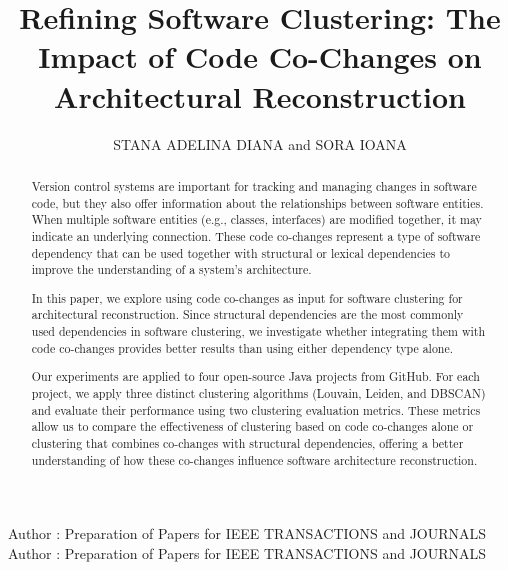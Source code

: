 \documentclass{ieeeaccess}
\begin{document}

\title{Refining Software Clustering: The Impact of Code Co-Changes on Architectural Reconstruction}
\author{\uppercase{Stana Adelina Diana} and
\uppercase{Sora Ioana}
}

\address[1]{Computer Science and Engineering Department
”Politehnica” University of Timisoara, Romania (e-mail: stana.adelina.diana@gmail.com)}
\address[2]{Computer Science and Engineering Department
”Politehnica” University of Timisoara, Romania (e-mail: ioana.sora@cs.upt.ro)}

\markboth
{Author \headeretal: Preparation of Papers for IEEE TRANSACTIONS and JOURNALS}
{Author \headeretal: Preparation of Papers for IEEE TRANSACTIONS and JOURNALS}



\begin{abstract}
Version control systems are important for tracking and managing changes in software code, but they also offer information about the relationships between software entities. When multiple software entities (e.g., classes, interfaces) are modified together, it may indicate an underlying connection. These code co-changes represent a type of software dependency that can be used together with structural or lexical dependencies to improve the understanding of a system's architecture.

In this paper, we explore using code co-changes as input for software clustering for architectural reconstruction. Since structural dependencies are the most commonly used dependencies in software clustering, we investigate whether integrating them with code co-changes provides better results than using either dependency type alone.

Our experiments are applied to four open-source Java projects from GitHub. For each project, we apply three distinct clustering algorithms (Louvain, Leiden, and DBSCAN) and evaluate their performance using two clustering evaluation metrics. These metrics allow us to compare the effectiveness of clustering based on code co-changes alone or clustering that combines co-changes with structural dependencies, offering a better understanding of how these co-changes influence software architecture reconstruction.
\end{abstract}
\end{document}

